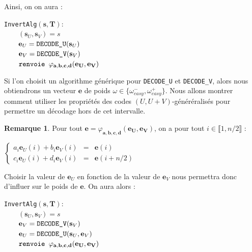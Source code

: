 \documentclass[12pt]{article}
\theoremstyle{plain}
\theoremstyle{definition}
\newtheorem{remarque}[thm]{Remarque}
\begin{document}
\noindent Ainsi, on on aura : \\
\begin{flushleft}
\leftskip=2cm
\verb|InvertAlg|$(\mathbf{s},\mathbf{T}) : $\\
$\qquad (\mathbf{s}_U, \mathbf{s}_V) = s $\\
$\qquad \mathbf{e}_U = \verb|DECODE_U|(\mathbf{s}_U) $\\
$\qquad \mathbf{e}_V = \verb|DECODE_V|(\mathbf{s}_V)$ \\
$\qquad \verb|renvoie | \varphi_{\mathbf{a},\mathbf{b},\mathbf{c},\mathbf{d}}(\mathbf{e_U},\mathbf{e_V})$ \\
\leftskip=0cm
\vspace{0.1in}

\end{flushleft}
Si l'on choisit un algorithme générique pour \verb|DECODE_U| et \verb|DECODE_V|, alors nous obtiendrons un vecteur $\mathbf{e}$ de poids $\omega \in \{\omega_{easy}^-,\omega_{easy}^+\}$. Nous allons montrer comment utiliser les propriétés des codes $(U,U+V)$-généréralisés pour permettre un décodage hors de cet intervalle. 

\begin{remarque} Pour tout $\mathbf{e} = \varphi_{\mathbf{a},\mathbf{b},\mathbf{c},\mathbf{d}}(\mathbf{e_U},\mathbf{e_V})$, on a pour tout $i \in \llbracket 1,n/2\rrbracket$ :
\begin{center}

$\left \{
\begin{array}{rcl}
a_i\mathbf{e}_U(i) + b_i\mathbf{e}_V(i) &=& \mathbf{e}(i) \\
c_i\mathbf{e}_U(i) + d_i\mathbf{e}_V(i) &=& \mathbf{e}(i+n/2) 
\end{array}
\right.$
\end{center}

\noindent Choisir la valeur de $\mathbf{e}_U$ en fonction de la valeur de $\mathbf{e}_V$ nous permettra donc d'influer sur le poids de $\mathbf{e}$. On aura alors :

\begin{flushleft}
\leftskip=2cm
\verb|InvertAlg|$(\mathbf{s},\mathbf{T}) : $\\
$\qquad (\mathbf{s}_U, \mathbf{s}_V) = s $\\
$\qquad \mathbf{e}_V = \verb|DECODE_V|(\mathbf{s}_V)$ \\
$\qquad \mathbf{e}_U = \verb|DECODE_U|(\mathbf{s}_U, \mathbf{e}_V) $\\
$\qquad \verb|renvoie | \varphi_{\mathbf{a},\mathbf{b},\mathbf{c},\mathbf{d}}(\mathbf{e_U},\mathbf{e_V})$ \\
\leftskip=0cm
\vspace{0.1in}
\end{flushleft}

\end{remarque}
\end{document}
